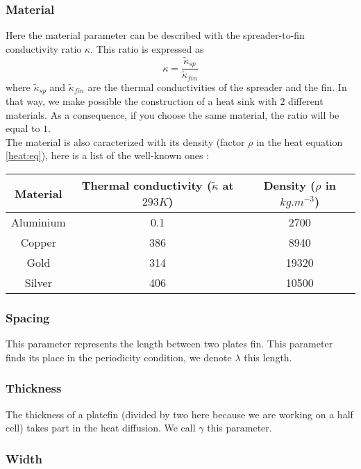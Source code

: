 \subsubsection{Material}

Here the material parameter can be described with the spreader-to-fin conductivity ratio $\kappa$. This ratio is expressed as
\begin{equation*}
\displaystyle{\kappa = \frac{\tilde{\kappa}_{sp}}{\tilde{\kappa}_{fin}}}
\end{equation*}
where $\tilde{\kappa}_{sp}$ and $\tilde{\kappa}_{fin}$ are the thermal conductivities of the spreader and the fin. In that way, we make possible the construction of a heat sink with $2$ different materials. As a consequence, if you choose the same material, the ratio will be equal to $1$. \\

\noindent The material is also caracterized with its density (factor $\rho$ in the heat equation \ref{heat:eq}), here is a list of the well-known ones :
\begin{center}
\begin{tabular}{|c|c|c|}
  \hline
  \textbf{Material} & \textbf{Thermal conductivity} ($\tilde{\kappa}$ at $293 K$) & \textbf{Density }($\rho$ in $kg.m^{-3}$) \\
  \hline
  Aluminium & 0.1 & 2700 \\
  \hline
  Copper & 386 & 8940 \\
  \hline
  Gold & 314 & 19320 \\
  \hline
  Silver & 406 & 10500 \\
  \hline
\end{tabular}
\end{center}

\subsubsection{Spacing}
This parameter represents the length between two plates fin. This parameter finds its place in the periodicity condition, we denote $\lambda$ this length.

\subsubsection{Thickness}
The thickness of a platefin (divided by two here because we are working on a half cell) takes part in the heat diffusion. We call $\gamma$ this parameter.

\subsubsection{Width}

